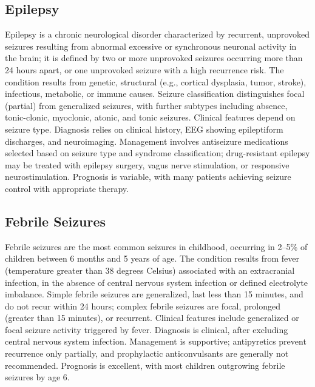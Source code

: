 \subsection{Epilepsy}
\label{sec:Epilepsy}
Epilepsy is a chronic neurological disorder characterized by recurrent, unprovoked seizures resulting from abnormal excessive or synchronous neuronal activity in the brain; it is defined by two or more unprovoked seizures occurring more than 24 hours apart, or one unprovoked seizure with a high recurrence risk. The condition results from genetic, structural (e.g., cortical dysplasia, tumor, stroke), infectious, metabolic, or immune causes. Seizure classification distinguishes focal (partial) from generalized seizures, with further subtypes including absence, tonic-clonic, myoclonic, atonic, and tonic seizures. Clinical features depend on seizure type. Diagnosis relies on clinical history, EEG showing epileptiform discharges, and neuroimaging. Management involves antiseizure medications selected based on seizure type and syndrome classification; drug-resistant epilepsy may be treated with epilepsy surgery, vagus nerve stimulation, or responsive neurostimulation. Prognosis is variable, with many patients achieving seizure control with appropriate therapy.

\subsection{Febrile Seizures}
\label{sec:Febrile Seizures}
Febrile seizures are the most common seizures in childhood, occurring in 2--5\% of children between 6 months and 5 years of age. The condition results from fever (temperature greater than 38 degrees Celsius) associated with an extracranial infection, in the absence of central nervous system infection or defined electrolyte imbalance. Simple febrile seizures are generalized, last less than 15 minutes, and do not recur within 24 hours; complex febrile seizures are focal, prolonged (greater than 15 minutes), or recurrent. Clinical features include generalized or focal seizure activity triggered by fever. Diagnosis is clinical, after excluding central nervous system infection. Management is supportive; antipyretics prevent recurrence only partially, and prophylactic anticonvulsants are generally not recommended. Prognosis is excellent, with most children outgrowing febrile seizures by age 6.

